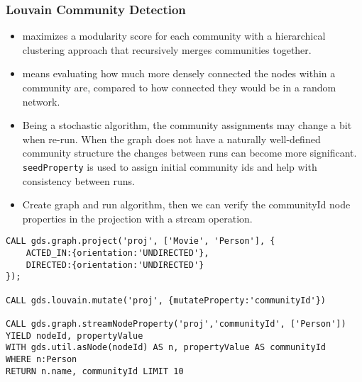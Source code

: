 \begin{frame}[fragile]\frametitle{Louvain Community Detection}

 
 \begin{itemize}
\item maximizes a modularity score for each community with a hierarchical clustering approach that recursively merges communities together. 
\item means evaluating how much more densely connected the nodes within a community are, compared to how connected they would be in a random network.
\item Being a stochastic algorithm, the community assignments may change a bit when re-run. When the graph does not have a naturally well-defined community structure the changes between runs can become more significant. \lstinline|seedProperty| is used to  assign initial community ids and help with consistency between runs. 
\item Create graph and run algorithm, then we can verify the communityId node properties in the projection with a stream operation.
\end{itemize}

\begin{lstlisting}
CALL gds.graph.project('proj', ['Movie', 'Person'], {
    ACTED_IN:{orientation:'UNDIRECTED'},
    DIRECTED:{orientation:'UNDIRECTED'}
});

CALL gds.louvain.mutate('proj', {mutateProperty:'communityId'})

CALL gds.graph.streamNodeProperty('proj','communityId', ['Person'])
YIELD nodeId, propertyValue
WITH gds.util.asNode(nodeId) AS n, propertyValue AS communityId
WHERE n:Person
RETURN n.name, communityId LIMIT 10
\end{lstlisting}

\end{frame}

